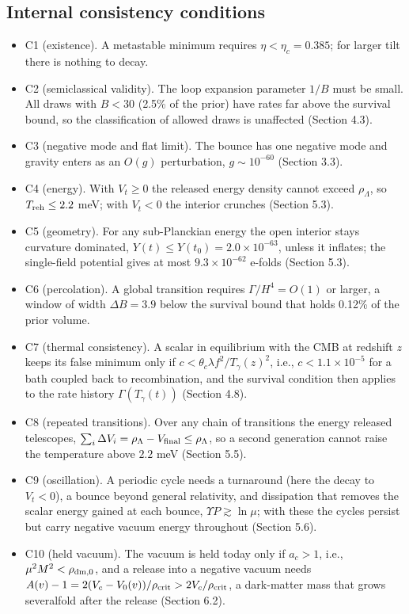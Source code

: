 \documentclass[11pt,a4paper]{article}
\begin{document}
\subsection{Internal consistency conditions}
\begin{itemize}\item C1 (existence). A metastable minimum requires $\eta<\eta_c=0.385$; for larger tilt there is nothing to decay.
\item C2 (semiclassical validity). The loop expansion parameter $1/B$ must be small. All draws with $B<30$ (2.5\% of the prior) have rates far above the survival bound, so the classification of allowed draws is unaffected (Section 4.3).
\item C3 (negative mode and flat limit). The bounce has one negative mode and gravity enters as an $O(g)$ perturbation, $g\sim10^{-60}$ (Section 3.3).
\item C4 (energy). With $V_t\ge0$ the released energy density cannot exceed $\rho_\Lambda$, so $T_{\rm reh}\le2.2$ meV; with $V_t<0$ the interior crunches (Section 5.3).
\item C5 (geometry). For any sub-Planckian energy the open interior stays curvature dominated, $Y(t)\le Y(t_0)=2.0\times10^{-63}$, unless it inflates; the single-field potential gives at most $9.3\times10^{-62}$ e-folds (Section 5.3).
\item C6 (percolation). A global transition requires $\Gamma/H^4=O(1)$ or larger, a window of width $\Delta B=3.9$ below the survival bound that holds 0.12\% of the prior volume.
\item C7 (thermal consistency). A scalar in equilibrium with the CMB at redshift $z$ keeps its false minimum only if $c<\theta_c\lambda f^2/T_\gamma(z)^2$, i.e., $c<1.1\times10^{-5}$ for a bath coupled back to recombination, and the survival condition then applies to the rate history $\Gamma(T_\gamma(t))$ (Section 4.8).
\item C8 (repeated transitions). Over any chain of transitions the energy released telescopes, $\sum_i\Delta V_i=\rho_\Lambda-V_{\rm final}\le\rho_\Lambda$, so a second generation cannot raise the temperature above $2.2$ meV (Section 5.5).
\item C9 (oscillation). A periodic cycle needs a turnaround (here the decay to $V_t<0$), a bounce beyond general relativity, and dissipation that removes the scalar energy gained at each bounce, $\Upsilon P\gtrsim\ln\mu$; with these the cycles persist but carry negative vacuum energy throughout (Section 5.6).
\item C10 (held vacuum). The vacuum is held today only if $a_c>1$, i.e., $\mu^2M^2<\rho_{\rm dm,0}$, and a release into a negative vacuum needs $A(v)-1=2(V_c-V_0(v))/\rho_{\rm crit}>2V_c/\rho_{\rm crit}$, a dark-matter mass that grows severalfold after the release (Section 6.2).

\end{itemize}
\end{document}
